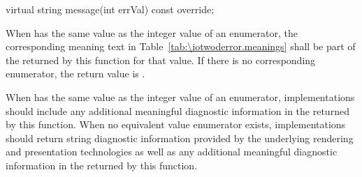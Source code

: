 \begin{itemdecl}
virtual string message(int errVal) const override;
\end{itemdecl}
\begin{itemdescr}
	\pnum
	\returns
	When  has the same value as the integer value of an 
	 enumerator, the corresponding meaning text in 
	Table~\ref{tab:\iotwoderror.meanings} shall be part of the 
	 returned by this function for that value. If there is no 
	corresponding enumerator, the return value is 
	.
	\begin{note}
	When  has the same value as the integer value of an 
	 enumerator, implementations should include any 
	additional meaningful diagnostic information in the  returned 
	by this function. When no equivalent value enumerator exists, 
	implementations should return string diagnostic information provided by the 
	underlying rendering and presentation technologies as well as any 
	additional meaningful diagnostic information in the  returned 
	by this function.
	\end{note}
	
\end{itemdescr}

